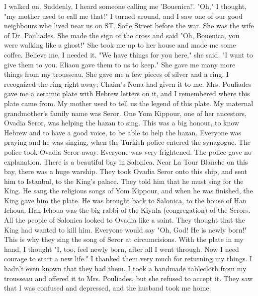 I walked on. Suddenly, I heard someone calling me 'Bouenica!’. 
"Oh," I thought, "my mother used to call me that!" I turned around, 
and I saw one of our good neighbours who lived near us on ST. Sofie 
Street before the war. She was the wife of Dr. Pouliades. She made the 
sign of the cross and said "Oh, Bouenica, you were walking like a 
ghost!" She took me up to her house and made me some coffee. Believe 
me, I needed it. 
"We have things for you here," she said. "I want to give them to
you. Eliaou gave them to us to keep." She gave me many more things 
from my trousseau. She gave me a few pieces of silver and a ring. I 
recognized the ring right away; Chaim's Nona had given it to me. Mrs.
Pouliades gave me a ceramic plate with Hebrew letters on it, and I remembered where this plate came from. 
My mother used to tell us the legend of this plate. My maternal 
grandmother's family name was Seror. One Yom Kippour, one of her 
ancestors, Ovadia Seror, was helping the hazan to sing. This was a big 
honour, to know Hebrew and to have a good voice, to be able to help the 
hazan. Everyone was praying and he was singing, when the Turkish police entered the synagogue. The police took Ovadia Seror away. Everyone was very frightened. The police gave no explanation. There is a 
beautiful bay in Salonica. Near La Tour Blanche on this bay, there 
was a huge warship. They took Ovadia Seror onto this ship, and sent 
him to Istanbul, to the King’s palace. They told him that he must sing 
for the King. He sang the religious songs of Yom Kippour, and when he 
was finished, the King gave him the plate. He was brought back to Salonica, to the house of Han Ichoua. Han Ichoua was the big rabbi of 
the Kiynla (congregation) of the Serors. All the people of Salonica 
looked to Ovadia like a saint. They thought that the King had wanted 
to kill him. Everyone would say "Oh, God! He is newly born!" This 
is why they sing the song of Seror at circumcisions. 
With the plate in my hand, I thought "I, too, feel newly born, after all I went through. Now I need courage to start a new life." I 
thanked them very much for returning my things. I hadn't even known 
that they had them. I took a handmade tablecloth from my trousseau and 
offered it to Mrs. Pouliades, but she refused to accept it. They saw 
that I was confused and depressed, and the husband took me home. 
